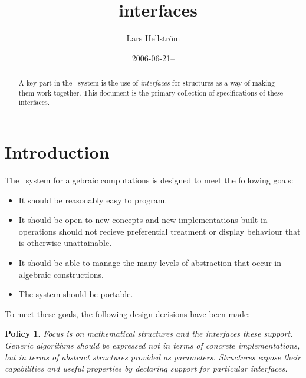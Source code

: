 \documentclass{mtmtcl}
\theoremstyle{plain}
\newtheorem{policy}{Policy}
\theoremstyle{remark}
\begin{document}
\title{\mtl~interfaces}
\author{Lars Hellstr\"om}
\date{2006-06-21--}
\maketitle


\begin{abstract}
  A key part in the \mtl\ system is the use of \emph{interfaces} 
  for structures as a way of making them work together. This 
  document is the primary collection of specifications of these 
  interfaces.
\end{abstract}

\tableofcontents


\section{Introduction}

The \mtl\ system for algebraic computations is designed to meet the 
following goals:
\begin{itemize}
  \item
    It should be reasonably easy to program. 
    \iffalse
    and in particular not 
    constantly burden the mathematician's mind with issues of how 
    data is being stored.
    \fi
  \item
    It should be open to new concepts and new implementations\Dash 
    built-in operations should not recieve preferential treatment or 
    display behaviour that is otherwise unattainable.
  \item
    It should be able to manage the many levels of abstraction that 
    occur in algebraic constructions.
  \item
    The system should be portable.
\end{itemize}
To meet these goals, the following design decisions have been made:

\begin{policy} \label{Pol:Strukturer}
  Focus is on mathematical \emph{structures} and the \emph{interfaces} 
  these support. Generic algorithms should be expressed not in terms 
  of concrete implementations, but in terms of abstract structures 
  provided as parameters. Structures expose their capabilities and 
  useful properties by declaring support for particular interfaces.
\end{policy}
\end{document}

